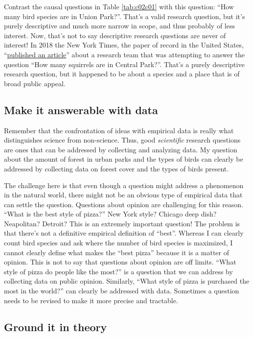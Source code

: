 \documentclass[
]{book}
\begin{document}
Contrast the causal questions in Table \ref{tab:c02c01} with this question: ``How many bird species are in Union Park?''. That's a valid research question, but it's purely descriptive and much more narrow in scope, and thus probably of less interest. Now, that's not to say descriptive research questions are never of interest! In 2018 the New York Times, the paper of record in the United States, ``\href{https://www.nytimes.com/2018/10/06/nyregion/squirrels-central-park.html}{published an article}'' about a research team that was attempting to answer the question ``How many squirrels are in Central Park?''. That's a purely descriptive research question, but it happened to be about a species and a place that is of broad public appeal.

\subsection{Make it answerable with data}\label{make-it-answerable-with-data}

Remember that the confrontation of ideas with empirical data is really what distinguishes science from non-science. Thus, good \emph{scientific} research questions are ones that can be addressed by collecting and analyzing data. My question about the amount of forest in urban parks and the types of birds can clearly be addressed by collecting data on forest cover and the types of birds present.

The challenge here is that even though a question might address a phenomenon in the natural world, there might not be an obvious type of empirical data that can settle the question. Questions about opinion are challenging for this reason. ``What is the best style of pizza?'' New York style? Chicago deep dish? Neapolitan? Detroit? This is an extremely important question! The problem is that there's not a definitive empirical definition of ``best''. Whereas I can clearly count bird species and ask where the number of bird species is maximized, I cannot clearly define what makes the ``best pizza'' because it is a matter of opinion. This is not to say that questions about opinion are off limits. ``What style of pizza do people like the most?'' is a question that we can address by collecting data on public opinion. Similarly, ``What style of pizza is purchased the most in the world?'' can clearly be addressed with data. Sometimes a question needs to be revised to make it more precise and tractable.

\subsection{Ground it in theory}\label{ground-it-in-theory}
\end{document}
